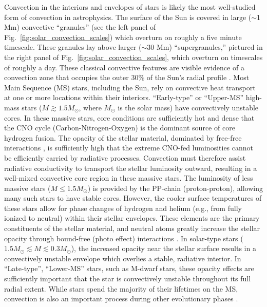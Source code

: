 Convection in the interiors and envelopes of stars is likely the most well-studied form of convection in astrophysics.
The surface of the Sun is covered in large ($\sim$1 Mm) convective ``granules'' (see the left panel of Fig.~\ref{fig:solar_convection_scales}) which overturn on roughly a five minute timescale.
These granules lay above larger ($\sim$30 Mm) ``supergranules,'' pictured in the right panel of Fig.~\ref{fig:solar_convection_scales}, which overturn on timescales of roughly a day.
These classical convective features are visible evidence of a convection zone that occupies the outer 30\% of the Sun's radial profile \citep{miesch2005, nordlund&all2009}.
Most Main Sequence (MS) stars, including the Sun, rely on convective heat transport at one or more locations within their interiors.
``Early-type'' or ``Upper-MS'' high-mass stars ($M \gtrsim 1.5 M_\odot$, where $M_\odot$ is the solar mass) have convectively unstable cores.
In these massive stars, core conditions are sufficiently hot and dense that the CNO cycle (Carbon-Nitrogen-Oxygen) is the dominant source of core hydrogen fusion.
The opacity of the stellar material, dominated by free-free interactions \citep[c.f.~Ch.~16 of][]{weiss&all2004}, is sufficiently high that the extreme CNO-fed luminosities cannot be efficiently carried by radiative processes.
Convection must therefore assist radiative conductivity to transport the stellar luminosity outward, resulting in a well-mixed convective core region in these massive stars.
The luminosity of less massive stars ($M \leq 1.5 M_\odot$) is provided by the PP-chain (proton-proton), allowing many such stars to have stable cores.
However, the cooler surface temperatures of these stars allow for phase changes of hydrogen and helium (e.g., from fully ionized to neutral) within their stellar envelopes.
These elements are the primary constituents of the stellar material, and neutral atoms greatly increase the stellar opacity through bound-free (photo effect) interactions \citep[and these effects were studied by][]{rast&toomre1993a, rast&toomre1993b}.
In solar-type stars ($1.5 M_\odot \lesssim M \lesssim 0.3 M_\odot$), the increased opacity near the stellar surface results in a convectively unstable envelope which overlies a stable, radiative interior.
In ``Late-type'', ``Lower-MS'' stars, such as M-dwarf stars, these opacity effects are sufficiently important that the star is convectively unstable throughout its full radial extent.
While stars spend the majority of their lifetimes on the MS, convection is also an important process during other evolutionary phases \citep[and I refer the reader to chapter 2 of][for a broad but brief overview of stellar evolutionary phases]{HKT}.

